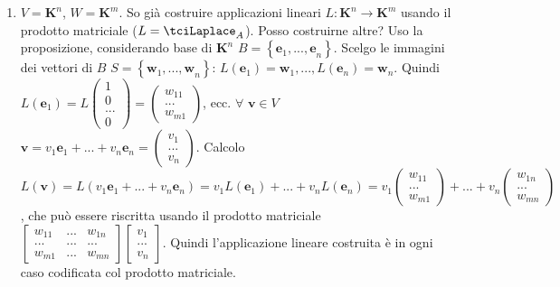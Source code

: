 \documentclass{article}
\begin{document}
\begin{enumerate}
\item $V=\mathbf{K}^{n}$, $W=\mathbf{K}^{m}$. So gi\`{a} costruire
applicazioni lineari $L:\mathbf{K}^{n}\rightarrow \mathbf{K}^{m}$ usando il
prodotto matriciale ($L=\tciLaplace _{A}$). Posso costruirne altre? Uso la
proposizione, considerando base di $\mathbf{K}^{n}$ $B=\left\{ \mathbf{e}_{1}%
\mathbf{,...,e}_{n}\right\} $. Scelgo le immagini dei vettori di $B$ $%
S=\left\{ \mathbf{w}_{1}\mathbf{,...,w}_{n}\right\} $: $L\left( \mathbf{e}%
_{1}\right) =\mathbf{w}_{1},...,L\left( \mathbf{e}_{n}\right) =\mathbf{w}%
_{n} $. Quindi $L\left( \mathbf{e}_{1}\right) =L\left( 
\begin{array}{c}
1 \\ 
0 \\ 
... \\ 
0%
\end{array}%
\right) =\left( 
\begin{array}{c}
w_{11} \\ 
... \\ 
w_{m1}%
\end{array}%
\right) $, ecc. $\forall $ $\mathbf{v}\in V$ $\mathbf{v}=v_{1}\mathbf{e}%
_{1}+...+v_{n}\mathbf{e}_{n}=\left( 
\begin{array}{c}
v_{1} \\ 
... \\ 
v_{n}%
\end{array}%
\right) $. Calcolo $L\left( \mathbf{v}\right) =L\left( v_{1}\mathbf{e}%
_{1}+...+v_{n}\mathbf{e}_{n}\right) =v_{1}L\left( \mathbf{e}_{1}\right)
+...+v_{n}L\left( \mathbf{e}_{n}\right) =v_{1}\left( 
\begin{array}{c}
w_{11} \\ 
... \\ 
w_{m1}%
\end{array}%
\right) +...+v_{n}\left( 
\begin{array}{c}
w_{1n} \\ 
... \\ 
w_{mn}%
\end{array}%
\right) $, che pu\`{o} essere riscritta usando il prodotto matriciale $\left[
\begin{array}{ccc}
w_{11} & ... & w_{1n} \\ 
... & ... & ... \\ 
w_{m1} & ... & w_{mn}%
\end{array}%
\right] \left[ 
\begin{array}{c}
v_{1} \\ 
... \\ 
v_{n}%
\end{array}%
\right] $. Quindi l'applicazione lineare costruita \`{e} in ogni caso
codificata col prodotto matriciale.


\end{enumerate}
\end{document}
